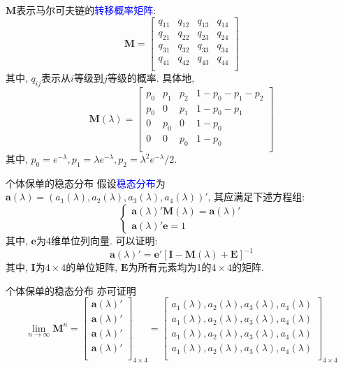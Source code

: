 \documentclass[professionalfont]{beamer}
\def\bM{\boldsymbol{M}}
\def\ba{\boldsymbol{a}}
\def\be{\boldsymbol{e}}
\def\bI{\boldsymbol{I}}
\def\bE{\boldsymbol{E}}
\newcommand{\blue}[1]{\textcolor{blue}{#1}}
\begin{document}
\begin{frame}
$\bM$表示马尔可夫链的\blue{转移概率矩阵}:
\begin{equation}
\bM=\begin{bmatrix} q_{11} & q_{12} & q_{13} & q_{14} \\q_{21} & q_{22} & q_{23} & q_{24} \\q_{31} & q_{32} & q_{33} & q_{34} \\q_{41} & q_{42} & q_{43} & q_{44} \\ \end{bmatrix}
\end{equation}
其中, $q_{ij}$表示从$i$等级到$j$等级的概率. 具体地, 
\begin{equation}
\bM(\lambda)=\begin{bmatrix} p_0 & p_1 & p_2 & 1-p_0-p_1-p_2\\ p_0& 0 & p_1 & 1-p_0-p_1 \\ 0 & p_0 & 0 & 1-p_0 \\ 0 & 0 & p_0 & 1-p_0 \\ \end{bmatrix}
\end{equation}
其中, $p_0=e^{-\lambda}, p_1=\lambda e^{-\lambda}, p_2=\lambda^2 e^{-\lambda}/2$.
\end{frame}

\begin{frame}{个体保单的稳态分布}
假设\blue{稳态分布}为$\ba(\lambda)=(a_1(\lambda), a_2(\lambda), a_3(\lambda), a_4(\lambda))'$, 其应满足下述方程组:
\begin{equation}
\begin{cases} \ba(\lambda)'\bM(\lambda)=\ba(\lambda)' \\ 
\ba(\lambda)'\be=1 \end{cases}
\end{equation}
其中, $\be$为4维单位列向量. 可以证明:
$$\ba(\lambda)'=\be'\left[\bI-\bM(\lambda)+\bE\right]^{-1}$$
其中, $\bI$为$4\times4$的单位矩阵, $\bE$为所有元素均为1的$4\times4$的矩阵. 
\end{frame}

\begin{frame}{个体保单的稳态分布}
亦可证明
\begin{equation} 
\lim_{n\to \infty}\bM^n=\begin{bmatrix} \ba(\lambda)' \\ \ba(\lambda)' \\ \ba(\lambda)' \\ \ba(\lambda)' \\ \end{bmatrix}_{4\times4}=\begin{bmatrix}a_1(\lambda), a_2(\lambda), a_3(\lambda), a_4(\lambda)\\ a_1(\lambda), a_2(\lambda), a_3(\lambda), a_4(\lambda) \\ a_1(\lambda), a_2(\lambda), a_3(\lambda), a_4(\lambda) \\ a_1(\lambda), a_2(\lambda), a_3(\lambda), a_4(\lambda) \\ \end{bmatrix}_{4\times4}
\end{equation}
\end{frame}
\end{document}
